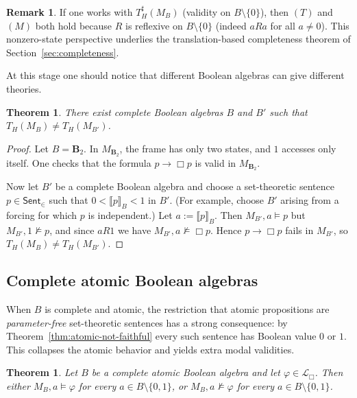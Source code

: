 \documentclass[11pt]{amsart}
\theoremstyle{definition}
\newtheorem{remark}[definition]{Remark}
\theoremstyle{plain}
\newtheorem{theorem}[definition]{Theorem}
\newcommand{\Sent}{\mathsf{Sent}}
\newcommand{\Lbox}{\mathcal L_{\Box}} %
\newcommand{\val}[1]{\llbracket #1\rrbracket_B}
\newcommand{\Btwo}{\mathbf{B}_2}
\begin{document}
\begin{remark}\label{rem:nonzero-bridge}
If one works with $T_H^\sharp(M_B)$ (validity on $B\setminus\{0\}$), then $(T)$ and $(M)$ both hold because
$R$ is reflexive on $B\setminus\{0\}$ (indeed $aRa$ for all $a\ne 0$). This nonzero-state perspective
underlies the translation-based completeness theorem of Section~\ref{sec:completeness}.
\end{remark}

At this stage one should notice that different Boolean algebras can give different theories.

\begin{theorem}\label{thm:different-theories}
There exist complete Boolean algebras $B$ and $B'$ such that $T_H(M_B)\ne T_H(M_{B'})$.
\end{theorem}

\begin{proof}
Let $B=\Btwo$. In $M_{\Btwo}$, the frame has only two states, and $1$ accesses only itself.
One checks that the formula $p\to \Box p$ is valid in $M_{\Btwo}$.

Now let $B'$ be a complete Boolean algebra and choose a set-theoretic sentence $p\in\Sent_{\in}$ such that
$0<\val{p}<1$ in $B'$. (For example, choose $B'$ arising from a forcing for which $p$ is independent.)
Let $a:=\val{p}$.
Then $M_{B'},a\models p$ but $M_{B'},1\not\models p$, and since $aR1$ we have $M_{B'},a\not\models \Box p$.
Hence $p\to\Box p$ fails in $M_{B'}$, so $T_H(M_B)\ne T_H(M_{B'})$.
\end{proof}

\subsection{Complete atomic Boolean algebras}

When $B$ is complete and atomic, the restriction that atomic propositions are \emph{parameter-free}
set-theoretic sentences has a strong consequence: by Theorem~\ref{thm:atomic-not-faithful} every such
sentence has Boolean value $0$ or $1$. This collapses the atomic behavior and yields extra modal validities.

\begin{theorem}\label{thm:atomic-uniformity}
Let $B$ be a complete atomic Boolean algebra and let $\varphi\in\Lbox$.
Then either $M_B,a\models \varphi$ for every $a\in B\setminus\{0,1\}$, or $M_B,a\not\models \varphi$ for every
$a\in B\setminus\{0,1\}$.
\end{theorem}
\end{document}
